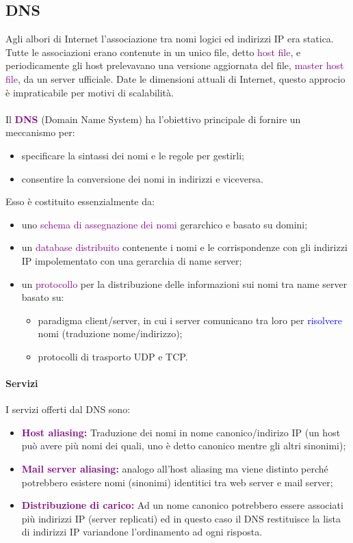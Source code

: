 \subsection{DNS}
Agli albori di Internet l'associazione tra nomi logici ed indirizzi IP era statica. 
Tutte le associazioni erano contenute in un unico file, detto \textcolor{purple}{host file}, e periodicamente gli host prelevavano una versione aggiornata del file, \textcolor{purple}{master host file}, da un server ufficiale.
Date le dimensioni attuali di Internet, questo approcio è impraticabile per motivi di scalabilità.
\\
\\Il \textbf{\textcolor{purple}{DNS}} (Domain Name System) ha l'obiettivo principale di fornire un meccanismo per:
\begin{itemize}
    \item specificare la sintassi dei nomi e le regole per gestirli;
    \item consentire la conversione dei nomi in indirizzi e viceversa.
\end{itemize}
Esso è costituito essenzialmente da:
\begin{itemize}
    \item uno \textcolor{purple}{schema di assegnazione dei nomi} gerarchico e basato su domini;
    \item un \textcolor{purple}{database distribuito} contenente i nomi e le corrispondenze con gli indirizzi IP impolementato con una gerarchia di name server;
    \item un \textcolor{purple}{protocollo} per la distribuzione delle informazioni sui nomi tra name server basato su:
        \begin{itemize}
            \item paradigma client/server, in cui i server comunicano tra loro per \textcolor{blue}{risolvere} nomi (traduzione nome/indirizzo);
            \item protocolli di trasporto UDP e TCP.
        \end{itemize}
\end{itemize}

\paragraph{Servizi} I servizi offerti dal DNS sono:
\begin{itemize}
    \item \textbf{\textcolor{purple}{Host aliasing:}} Traduzione dei nomi in nome canonico/indirizo IP (un host può avere più nomi dei quali, uno è detto canonico mentre gli altri sinonimi); 
    \item \textbf{\textcolor{purple}{Mail server aliasing:}} analogo all'host aliasing ma viene distinto perché potrebbero esistere nomi (sinonimi) identitici tra web server e mail server;
    \item \textbf{\textcolor{purple}{Distribuzione di carico:}} Ad un nome canonico potrebbero essere associati più indirizzi IP (server replicati) ed in questo caso il DNS restituisce la lista di indirizzi IP variandone l'ordinamento ad ogni risposta.
\end{itemize}

